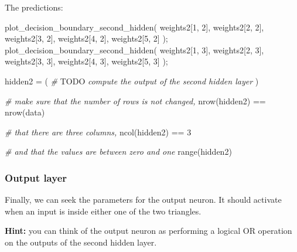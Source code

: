 \documentclass[
]{article}
\newenvironment{Shaded}{\begin{snugshade}}{\end{snugshade}}
\newcommand{\AlertTok}[1]{\textcolor[rgb]{0.94,0.16,0.16}{#1}}
\newcommand{\CommentTok}[1]{\textcolor[rgb]{0.56,0.35,0.01}{\textit{#1}}}
\newcommand{\DecValTok}[1]{\textcolor[rgb]{0.00,0.00,0.81}{#1}}
\newcommand{\FunctionTok}[1]{\textcolor[rgb]{0.00,0.00,0.00}{#1}}
\newcommand{\NormalTok}[1]{#1}
\newcommand{\OtherTok}[1]{\textcolor[rgb]{0.56,0.35,0.01}{#1}}
\newcommand{\SpecialCharTok}[1]{\textcolor[rgb]{0.00,0.00,0.00}{#1}}
\begin{document}
The predictions:

\begin{Shaded}
\begin{Highlighting}[]
\FunctionTok{plot\_decision\_boundary\_second\_hidden}\NormalTok{(}
\NormalTok{  weights2[}\DecValTok{1}\NormalTok{, }\DecValTok{2}\NormalTok{], weights2[}\DecValTok{2}\NormalTok{, }\DecValTok{2}\NormalTok{], weights2[}\DecValTok{3}\NormalTok{, }\DecValTok{2}\NormalTok{], weights2[}\DecValTok{4}\NormalTok{, }\DecValTok{2}\NormalTok{], weights2[}\DecValTok{5}\NormalTok{, }\DecValTok{2}\NormalTok{]}
\NormalTok{);}
\FunctionTok{plot\_decision\_boundary\_second\_hidden}\NormalTok{(}
\NormalTok{  weights2[}\DecValTok{1}\NormalTok{, }\DecValTok{3}\NormalTok{], weights2[}\DecValTok{2}\NormalTok{, }\DecValTok{3}\NormalTok{], weights2[}\DecValTok{3}\NormalTok{, }\DecValTok{3}\NormalTok{], weights2[}\DecValTok{4}\NormalTok{, }\DecValTok{3}\NormalTok{], weights2[}\DecValTok{5}\NormalTok{, }\DecValTok{3}\NormalTok{]}
\NormalTok{);}
\end{Highlighting}
\end{Shaded}

\begin{Shaded}
\begin{Highlighting}[]
\NormalTok{hidden2 }\OtherTok{=}\NormalTok{ (}
  \CommentTok{\# }\AlertTok{TODO}\CommentTok{ compute the output of the second hidden layer}
\NormalTok{)}

\CommentTok{\# make sure that the number of rows is not changed,}
\FunctionTok{nrow}\NormalTok{(hidden2) }\SpecialCharTok{==} \FunctionTok{nrow}\NormalTok{(data)}

\CommentTok{\# that there are three columns,}
\FunctionTok{ncol}\NormalTok{(hidden2) }\SpecialCharTok{==} \DecValTok{3}

\CommentTok{\# and that the values are between zero and one}
\FunctionTok{range}\NormalTok{(hidden2)}
\end{Highlighting}
\end{Shaded}

\hypertarget{output-layer}{%
\subsubsection{Output layer}\label{output-layer}}

Finally, we can seek the parameters for the output neuron. It should
activate when an input is inside either one of the two triangles.

\textbf{Hint:} you can think of the output neuron as performing a
logical OR operation on the outputs of the second hidden layer.
\end{document}
